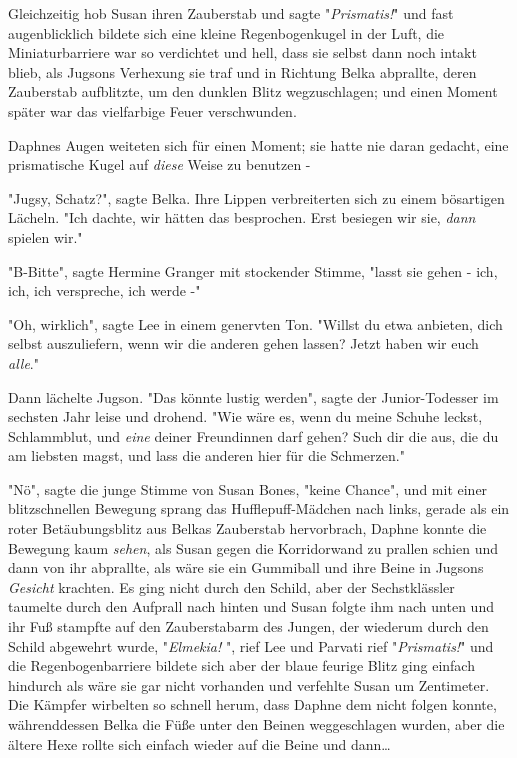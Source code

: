 {Gleichzeitig hob Susan ihren Zauberstab und sagte "\emph{Prismatis!}" und fast augenblicklich bildete sich eine kleine Regenbogenkugel in der Luft, die Miniaturbarriere war so verdichtet und hell, dass sie selbst dann noch intakt blieb, als Jugsons Verhexung sie traf und in Richtung Belka abprallte, deren Zauberstab aufblitzte, um den dunklen Blitz wegzuschlagen; und einen Moment später war das vielfarbige Feuer verschwunden.

Daphnes Augen weiteten sich für einen Moment; sie hatte nie daran gedacht, eine prismatische Kugel auf \emph{diese} Weise zu benutzen -

"Jugsy, Schatz?", sagte Belka. Ihre Lippen verbreiterten sich zu einem bösartigen Lächeln. "Ich dachte, wir hätten das besprochen. Erst besiegen wir sie, \emph{dann} spielen wir."

"B-Bitte", sagte Hermine Granger mit stockender Stimme, "lasst sie gehen - ich, ich, ich verspreche, ich werde -"

"Oh, wirklich", sagte Lee in einem genervten Ton. "Willst du etwa anbieten, dich selbst auszuliefern, wenn wir die anderen gehen lassen? Jetzt haben wir euch \emph{alle}."

Dann lächelte Jugson. "Das könnte lustig werden", sagte der Junior-Todesser im sechsten Jahr leise und drohend. "Wie wäre es, wenn du meine Schuhe leckst, Schlammblut, und \emph{eine} deiner Freundinnen darf gehen? Such dir die aus, die du am liebsten magst, und lass die anderen hier für die Schmerzen."

"Nö", sagte die junge Stimme von Susan Bones, "keine Chance", und mit einer blitzschnellen Bewegung sprang das Hufflepuff-Mädchen nach links, gerade als ein roter Betäubungsblitz aus Belkas Zauberstab hervorbrach, Daphne konnte die Bewegung kaum \emph{sehen}, als Susan gegen die Korridorwand zu prallen schien und dann von ihr abprallte, als wäre sie ein Gummiball und ihre Beine in Jugsons \emph{Gesicht} krachten. Es ging nicht durch den Schild, aber der Sechstklässler taumelte durch den Aufprall nach hinten und Susan folgte ihm nach unten und ihr Fuß stampfte auf den Zauberstabarm des Jungen, der wiederum durch den Schild abgewehrt wurde, "\emph{Elmekia!} ", rief Lee und Parvati rief "\emph{Prismatis!}" und die Regenbogenbarriere bildete sich aber der blaue feurige Blitz ging einfach hindurch als wäre sie gar nicht vorhanden und verfehlte Susan um Zentimeter. Die Kämpfer wirbelten so schnell herum, dass Daphne dem nicht folgen konnte, währenddessen Belka die Füße unter den Beinen weggeschlagen wurden, aber die ältere Hexe rollte sich einfach wieder auf die Beine und dann…

}
